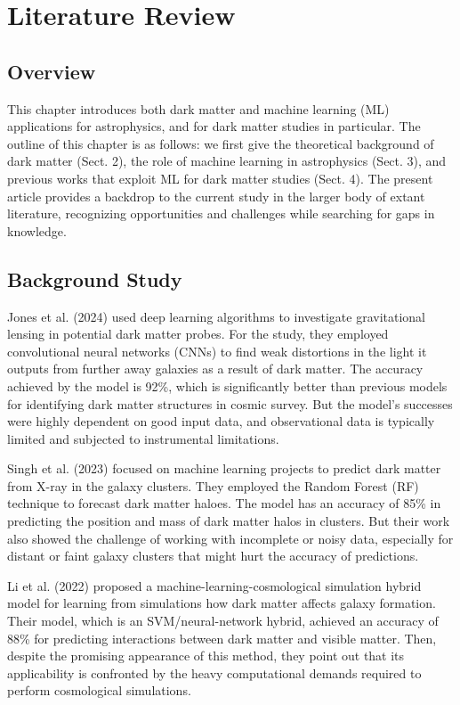 
\chapter{Literature Review}
\label{chap:2}

\section{Overview} 

 This chapter introduces both dark matter and machine learning (ML) applications for astrophysics, and for dark matter studies in particular. The outline of this chapter is as follows: we first give the theoretical background of dark matter (Sect. 2), the role of machine learning in astrophysics (Sect. 3), and previous works that exploit ML for dark matter studies (Sect. 4). The present article provides a backdrop to the current study in the larger body of extant literature, recognizing opportunities and challenges while searching for gaps in knowledge.

\section{Background Study}
Jones et al. (2024) used deep learning algorithms to investigate gravitational lensing in potential dark matter probes.\cite{jones2024} For the study, they employed convolutional neural networks (CNNs) to find weak distortions in the light it outputs from further away galaxies as a result of dark matter. The accuracy achieved by the model is 92\%, which is significantly better than previous models for identifying dark matter structures in cosmic survey. But the model’s successes were highly dependent on good input data, and observational data is typically limited and subjected to instrumental limitations.

Singh et al. (2023) focused on machine learning projects to predict dark matter from X-ray in the galaxy clusters.\cite{singh2023} They employed the Random Forest (RF) technique to forecast dark matter haloes. The model has an accuracy of 85\% in predicting the position and mass of dark matter halos in clusters. But their work also showed the challenge of working with incomplete or noisy data, especially for distant or faint galaxy clusters that might hurt the accuracy of predictions.

Li et al. (2022) proposed a machine-learning-cosmological simulation hybrid model for learning from simulations how dark matter affects galaxy formation. \cite{li2022} Their model, which is an SVM/neural-network hybrid, achieved an accuracy of 88\% for predicting interactions between dark matter and visible matter. Then, despite the promising appearance of this method, they point out that its applicability is confronted by the heavy computational demands required to perform cosmological simulations.

